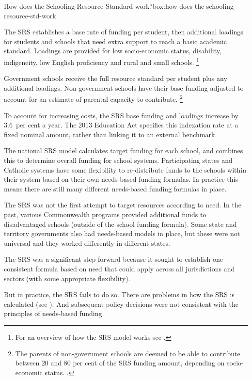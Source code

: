 \documentclass{grattan}
\begin{document}
\begin{smallbox}{How does the Schooling Resource Standard work?}{box:how-does-the-schooling-resource-std-work}

The SRS establishes a base rate of funding per student, then additional loadings for students and schools that need extra support to reach a basic academic standard.
Loadings are provided for low socio-economic status, disability, indigeneity, low English proficiency and rural and small schools.%
\footnote{For an overview of how the SRS model works see \textcite{Independent2014SRSFundingModel}.}

Government schools receive the full resource standard per student plus any additional loadings.
Non-government schools have their base funding adjusted to account for an estimate of parental capacity to contribute.%
\footnote{The parents of non-government schools are deemed to be able to contribute between 20 and 80 per cent of the SRS funding amount, depending on socio-economic status. \textcite{ABS2016SchoolsAustralia}.}

To account for increasing costs, the SRS base funding and loadings increase by 3.6~per cent a year.
The 2013 Education Act specifies this indexation rate at a fixed nominal amount, rather than linking it to an external benchmark.

The national SRS model calculates target funding for each school, and combines this to determine overall funding for school systems.
Participating states and Catholic systems have some flexibility to re-distribute funds to the schools within their system based on their own needs-based funding formulas. In practice this means there are still many different needs-based funding formulas in place.
\end{smallbox}

The SRS was not the first attempt to target resources according to need.
In the past, various Commonwealth programs provided additional funds to disadvantaged schools (outside of the school funding formula).
Some state and territory governments also had needs-based models in place, but these were not universal and they worked differently in different states.

The SRS was a significant step forward because it sought to establish one consistent formula based on need that could apply across all jurisdictions and sectors (with some appropriate flexibility).

But in practice, the SRS fails to do so. There are problems in how the SRS is calculated (see ).
And subsequent policy decisions were not consistent with the principles of needs-based funding.
\end{document}
